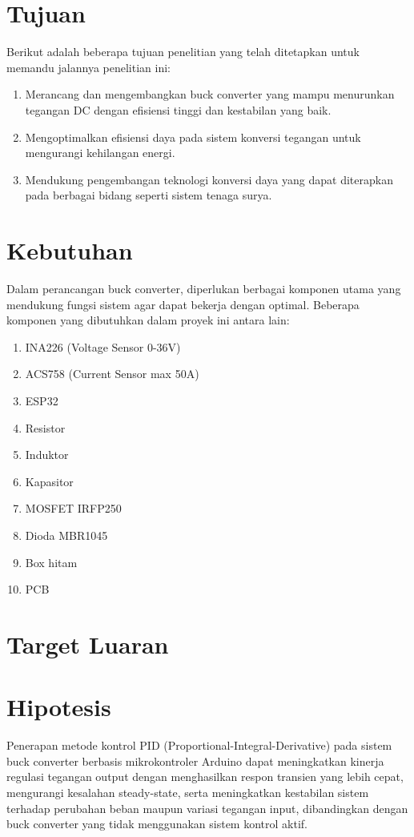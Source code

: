 \section{Tujuan }
Berikut adalah beberapa tujuan penelitian yang telah ditetapkan untuk memandu jalannya penelitian ini: 
\begin{enumerate}
    \item Merancang dan mengembangkan buck converter yang mampu menurunkan tegangan DC dengan efisiensi tinggi dan kestabilan yang baik.
    \item Mengoptimalkan efisiensi daya pada sistem konversi tegangan untuk mengurangi kehilangan energi.
    \item Mendukung pengembangan teknologi konversi daya yang dapat diterapkan pada berbagai bidang seperti sistem tenaga surya.
\end{enumerate}

\section{Kebutuhan}
Dalam perancangan buck converter, diperlukan berbagai komponen utama yang mendukung fungsi sistem agar dapat bekerja dengan optimal. Beberapa komponen yang dibutuhkan dalam proyek ini antara lain:
\begin{enumerate}
    \item INA226 (Voltage Sensor 0-36V)
    \item ACS758 (Current Sensor max 50A)
    \item ESP32
    \item Resistor
    \item Induktor
    \item Kapasitor
    \item MOSFET IRFP250
    \item Dioda MBR1045
    \item Box hitam
    \item PCB
\end{enumerate}

\section{Target Luaran}


\section{Hipotesis}
Penerapan metode kontrol PID (Proportional-Integral-Derivative) pada sistem buck converter berbasis mikrokontroler Arduino dapat meningkatkan kinerja regulasi tegangan output dengan menghasilkan respon transien yang lebih cepat, mengurangi kesalahan steady-state, serta meningkatkan kestabilan sistem terhadap perubahan beban maupun variasi tegangan input, dibandingkan dengan buck converter yang tidak menggunakan sistem kontrol aktif.

